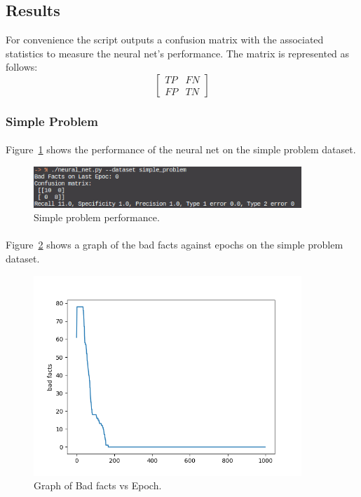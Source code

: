 \documentclass[11pt, a4paper]{article}
\begin{document}
        \subsection{Results}
            For convenience the script outputs a confusion matrix with the associated statistics to measure the neural net's performance. The matrix is represented as follows: 
            \[
                \begin{bmatrix}
                    TP & FN \\
                    FP & TN
                \end{bmatrix}
            \]
            \subsubsection{Simple Problem}
            \paragraph{}Figure~\ref{fig:simple_problem_perf} shows the performance of the neural net on the simple problem dataset.
            \begin{figure}[H]
                \centering
                \includegraphics[width=0.9\textwidth, keepaspectratio]{simple_problem_stats.png}
                \caption{Simple problem performance.}
                \label{fig:simple_problem_perf}
            \end{figure}
            \paragraph{}Figure~\ref{fig:simple_problem_bad_epoch} shows  a graph of the bad facts against epochs on the simple problem dataset.
            \begin{figure}[H]
                \centering
                \includegraphics[width=0.9\textwidth, keepaspectratio]{simple_problem.png}
                \caption{Graph of Bad facts vs Epoch.}
                \label{fig:simple_problem_bad_epoch}
            \end{figure}
\end{document}
